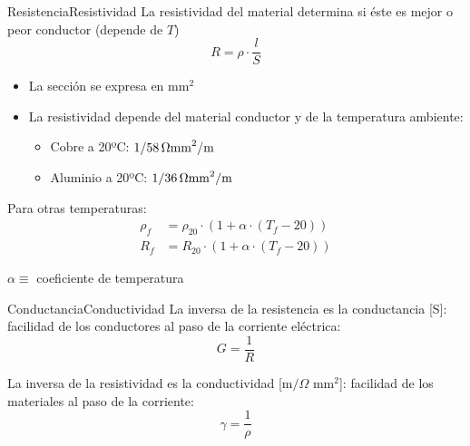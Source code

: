 \documentclass[aspectratio=169, xcolor={usenames,svgnames,dvipsnames}]{beamer}
\begin{document}
\begin{frame}{Resistencia}{Resistividad}
La \alert{resistividad} del material determina si éste es mejor o peor conductor (depende de $T$)
\begin{equation*}
  R = \rho \cdot \frac{l}{S}
\end{equation*}

\begin{itemize}
\item La \alert{sección} se expresa en \(\si{\milli\meter\squared}\)

\item La \alert{resistividad} depende del material conductor y de la temperatura ambiente:
\begin{itemize}
\item Cobre a 20ºC: \(\qty[parse-numbers = false]{1/58}{\ohm\milli\meter\squared/\meter}\)
\item Aluminio a 20ºC: \(\qty[parse-numbers = false]{1/36}{\ohm\milli\meter\squared/\meter}\)
\end{itemize}
\end{itemize}
\begin{minipage}[c]{0.48\linewidth}
Para otras temperaturas:
\begin{align*}
    \rho_f&=\rho_{20}\cdot (1+\alpha\cdot (T_f-20)) \\
	R_f&=R_{20}\cdot (1+\alpha\cdot (T_f-20))
\end{align*}
\end{minipage}
\hfill
\begin{minipage}[c]{0.48\linewidth}
$\alpha \equiv$ coeficiente de temperatura
\end{minipage}
\end{frame}

\begin{frame}{Conductancia}{Conductividad}
    	La inversa de la resistencia es la \alert{conductancia} [S]: facilidad de los conductores al paso de la corriente eléctrica:
	\begin{equation*}
		\boxed{G=\dfrac{1}{R}}
	\end{equation*}
	
	La inversa de la resistividad es la \alert{conductividad} [m$/\Omega$ mm$^2$]: facilidad de los materiales al paso de la corriente:
	\begin{equation*}
		\gamma=\dfrac{1}{\rho}
	\end{equation*}
\end{frame}
\end{document}
